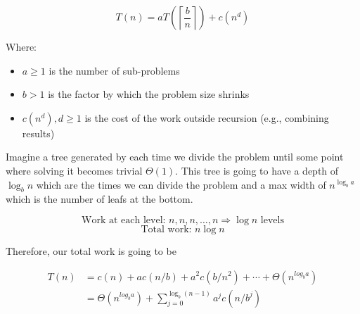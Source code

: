 \[
    T(n) = a T(\left\lceil\frac{b}{n}\right\rceil) + c(n^d)
\]

Where:

\begin{itemize}

    \item \(a \geq 1\) is the number of sub-problems

    \item \(b > 1\) is the factor by which the problem size shrinks

    \item \(c(n^d), d \ge 1\) is the cost of the work outside recursion (e.g., combining results)

\end{itemize}

Imagine a tree generated by each time we divide the problem until some point where solving it becomes 
trivial \(\Theta (1)\). This tree is going to have a depth of \(\log_b n\) which are the times 
we can divide the problem and a max width of \(n^{\log_b a}\) which is the number of leafs at the bottom.

\begin{center}
\end{center}

\[
    \text{Work at each level: } n, n, n, \ldots, n \Rightarrow \log n \text{ levels}
\]
\[
    \text{Total work: } n \log n
\]

Therefore, our total work is going to be 

\begin{align*}
    T(n) &= c(n) + a c(n/b) + a^2 c(b/n^2) + \cdots + \Theta(n^{log_b a})\\
         &=  \Theta(n^{log_b a}) + \sum_{j = 0}^{\log_b(n - 1)}a^j c (n/b^j)
\end{align*}

